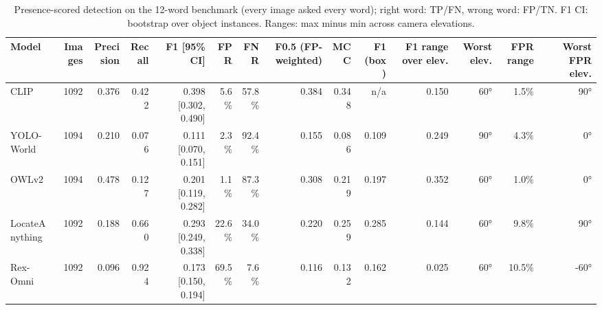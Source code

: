 \begin{table}[t]
\centering
\small
\begin{tabular}{lrrrrrrrrrrrrr}
\toprule
Model & Images & Precision & Recall & F1 [95\% CI] & FPR & FNR & F0.5 (FP-weighted) & MCC & F1 (box) & F1 range over elev. & Worst elev. & FPR range & Worst FPR elev. \\
\midrule
CLIP & 1092 & 0.376 & 0.422 & 0.398 [0.302, 0.490] & 5.6\% & 57.8\% & 0.384 & 0.348 & n/a & 0.150 & 60° & 1.5\% & 90° \\
YOLO-World & 1094 & 0.210 & 0.076 & 0.111 [0.070, 0.151] & 2.3\% & 92.4\% & 0.155 & 0.086 & 0.109 & 0.249 & 90° & 4.3\% & 0° \\
OWLv2 & 1094 & 0.478 & 0.127 & 0.201 [0.119, 0.282] & 1.1\% & 87.3\% & 0.308 & 0.219 & 0.197 & 0.352 & 60° & 1.0\% & 0° \\
LocateAnything & 1092 & 0.188 & 0.660 & 0.293 [0.249, 0.338] & 22.6\% & 34.0\% & 0.220 & 0.259 & 0.285 & 0.144 & 60° & 9.8\% & 90° \\
Rex-Omni & 1092 & 0.096 & 0.924 & 0.173 [0.150, 0.194] & 69.5\% & 7.6\% & 0.116 & 0.132 & 0.162 & 0.025 & 60° & 10.5\% & -60° \\
\bottomrule
\end{tabular}
\caption{Presence-scored detection on the 12-word benchmark (every image asked every word); right word: TP/FN, wrong word: FP/TN. F1 CI: bootstrap over object instances. Ranges: max minus min across camera elevations.}
\end{table}
